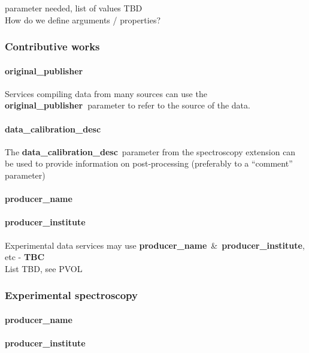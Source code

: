 \documentclass[11pt,a4paper]{ivoa}
\begin{document}
parameter needed, list of values TBD\\How do we define arguments / properties?

\subsubsection{Contributive works\\}

\paragraph{original\_publisher}

Services compiling data from many sources can use the \textbf{original\_publisher }parameter to refer to the source of the data.

\paragraph{data\_calibration\_desc}

The\textbf{ }\textbf{data\_calibration\_desc} parameter from the spectroscopy extension can be used to provide information on post-processing (preferably to a ``comment'' parameter)

\paragraph{producer\_name}

\paragraph{producer\_institute\\}

Experimental data services may use \textbf{producer\_name} \& \textbf{producer\_institute}, etc - \textbf{TBC}\\List TBD, see PVOL

\subsubsection{Experimental spectroscopy\\}

\paragraph{producer\_name}

\paragraph{producer\_institute}
\end{document}
